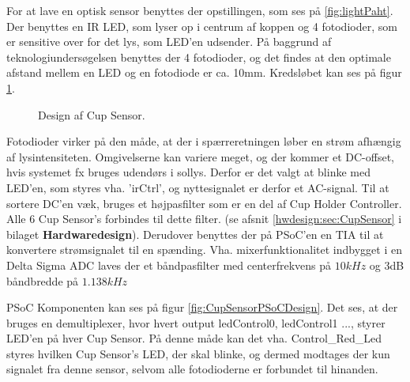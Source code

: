 \documentclass[Rapport/Rapport_main.tex]{subfiles}
\begin{document}
For at lave en optisk sensor benyttes der opstillingen, som ses på \ref{fig:lightPaht}. Der benyttes en IR LED, som lyser op i centrum af koppen og 4 fotodioder, som er sensitive over for det lys, som LED'en udsender. På baggrund af teknologiundersøgelsen benyttes der 4 fotodioder, og det findes at den optimale afstand mellem en LED og en fotodiode er ca. 10mm. Kredsløbet kan ses på figur \ref{fig:CupSensorDesign}.
\begin{figure}[H]
    \centering
    \caption{Design af Cup Sensor.}
    \label{fig:CupSensorDesign}
\end{figure}
Fotodioder virker på den måde, at der i spærreretningen løber en strøm afhængig af lysintensiteten. Omgivelserne kan variere meget, og der kommer et DC-offset, hvis systemet fx bruges udendørs i sollys. Derfor er det valgt at blinke med LED'en, som styres vha. 'irCtrl', og nyttesignalet er derfor et AC-signal. Til at sortere DC'en væk, bruges et højpasfilter som er en del af Cup Holder Controller. Alle 6 Cup Sensor's forbindes til dette filter. (se afsnit \ref{hwdesign:sec:CupSensor} i bilaget \textbf{Hardwaredesign}). 
Derudover benyttes der på PSoC'en en TIA til at konvertere strømsignalet til en spænding. Vha. mixerfunktionalitet indbygget i en Delta Sigma ADC laves der et båndpasfilter med centerfrekvens på $10\si{kHz}$ og 3dB båndbredde på $1.138\si{kHz}$ 

PSoC Komponenten kan ses på figur \ref{fig:CupSensorPSoCDesign}. Det ses, at der bruges en demultiplexer, hvor hvert output ledControl0, ledControl1 ..., styrer LED'en på hver Cup Sensor. På denne måde kan det vha. Control\_Red\_Led styres hvilken Cup Sensor's LED, der skal blinke, og dermed modtages der kun signalet fra denne sensor, selvom alle fotodioderne er forbundet til hinanden.  
\end{document}
